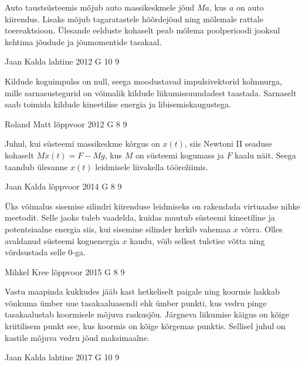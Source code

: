 \documentclass[11pt]{article}
\begin{document}
{{\ifHint
Auto taustsüsteemis mõjub auto massikeskmele jõud $Ma$, kus $a$ on auto kiirendus. Lisaks mõjub tagaratastele hõõrdejõud ning mõlemale rattale toereaktsioon. Ülesande eelduste kohaselt peab mõlema poolperioodi jooksul kehtima jõudude ja jõumomentide tasakaal.
\fi
}

{Jaan Kalda} %
{lahtine} %
{2012} %
{G 10} %
{9} %
{

\ifHint
Kildude koguimpulss on null, seega moodustavad impulsivektorid kolmnurga, mille sarnasustegurid on võimalik kildude liikumissuundadest taastada. Sarnaselt saab toimida kildude kineetilise energia ja libisemiskaugustega.
\fi
}

{Roland Matt} %
{lõppvoor} %
{2012} %
{G 8} %
{9} %
{

\ifHint
Juhul, kui süsteemi massikeskme kõrgus on $x(t)$, siis Newtoni II seaduse kohaselt $M\ddot{x}(t) = F - Mg$, kus $M$ on süsteemi kogumass ja $F$ kaalu näit. Seega taandub ülesanne $x(t)$ leidmisele liivakella töörežiimis.
\fi
}

{Jaan Kalda} %
{lõppvoor} %
{2014} %
{G 8} %
{9} %
{

\ifHint
Üks võimalus sisemise silindri kiirenduse leidmiseks on rakendada virtuaalse nihke meetodit. Selle jaoks tuleb vaadelda, kuidas muutub süsteemi kineetiline ja potentsiaalne energia siis, kui sisemine silinder kerkib vahemaa $x$ võrra. Olles avaldanud süsteemi koguenergia $x$ kaudu, võib sellest tuletise võtta ning võrdsustada selle \num{0}-ga.
\fi
}

{Mihkel Kree} %
{lõppvoor} %
{2015} %
{G 8} %
{9} %
{

\ifHint
Vastu maapinda kukkudes jääb kast hetkeliselt paigale ning koormis hakkab võnkuma ümber uue tasakaaluasendi ehk ümber punkti, kus vedru pinge tasakaalustab koormisele mõjuva raskusjõu. Järgneva liikumise käigus on kõige kriitilisem punkt see, kus koormis on kõige kõrgemas punktis. Sellisel juhul on kastile mõjuva vedru jõud maksimaalne.
\fi
}

{Jaan Kalda} %
{lahtine} %
{2017} %
{G 10} %
{9} %
{

}}
\end{document}
